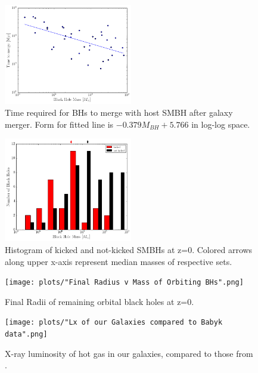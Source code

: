 \documentclass[fleqn,usenatbib,useAMS]{mnras}
\begin{document}
\begin{figure}
\begin{center}
\includegraphics[width=0.5\textwidth]{plots/time_to_merge.png}
\caption{Time required for BHs to merge with host SMBH after galaxy merger.  Form for fitted line is $-0.379M_{BH}+5.766$ in log-log space.}
\label{fig:time_to_merge}
\end{center}
\end{figure}

\begin{figure}
\begin{center}
\includegraphics[width=0.5\textwidth]{plots/kicked_stats.png}
\caption{Histogram of kicked and not-kicked SMBHs at z=0.  Colored arrows along upper x-axis represent median masses of respective sets.}
\label{fig:kicked_stats}
\end{center}
\end{figure}

\begin{figure}
\begin{center}
\texttt{[image: plots/"Final Radius v Mass of Orbiting BHs".png]}
\caption{Final Radii of remaining orbital black holes at z=0.}
\label{fig:mvr}
\end{center}
\end{figure}

\begin{figure}
\vspace{20pt}%
\begin{center}
\texttt{[image: plots/"Lx of our Galaxies compared to Babyk data".png]}
\caption{X-ray luminosity of hot gas in our galaxies, compared to those from \citet{2018ApJ...857...32B}.}
\label{fig:galgas1}
\end{center}
\end{figure}
\end{document}
